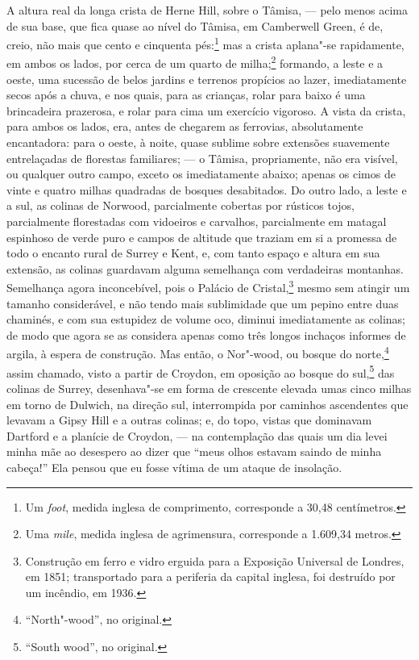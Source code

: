 A altura real da longa crista de Herne Hill, sobre o Tâmisa, --- pelo
menos acima de sua base, que fica quase ao nível do Tâmisa, em
Camberwell Green, é de, creio, não mais que cento e cinquenta
pés:\footnote{Um \textit{foot}, medida inglesa de comprimento, corresponde
  a 30,48 centímetros.} mas a crista aplana"-se rapidamente, em
ambos os lados, por cerca de um quarto de milha;\footnote{Uma
  \textit{mile}, medida inglesa de agrimensura, corresponde a 1.609,34 metros.} formando, a leste e a oeste, uma sucessão de belos
jardins e terrenos propícios ao lazer, imediatamente secos após a chuva,
e nos quais, para as crianças, rolar para baixo é uma brincadeira
prazerosa, e rolar para cima um exercício vigoroso. A vista da crista,
para ambos os lados, era, antes de chegarem as ferrovias, absolutamente
encantadora: para o oeste, à noite, quase sublime sobre extensões
suavemente entrelaçadas de florestas familiares; --- o Tâmisa,
propriamente, não era visível, ou qualquer outro campo, exceto os
imediatamente abaixo; apenas os cimos de vinte e quatro milhas quadradas
de bosques desabitados. Do outro lado, a leste e a sul, as colinas de
Norwood, parcialmente cobertas por rústicos tojos, parcialmente
florestadas com vidoeiros e carvalhos, parcialmente em matagal espinhoso
de verde puro e campos de altitude que traziam em si a promessa de todo
o encanto rural de Surrey e Kent, e, com tanto espaço e altura em sua
extensão, as colinas guardavam alguma semelhança com verdadeiras
montanhas. Semelhança agora inconcebível, pois o Palácio de
Cristal,\footnote{Construção em ferro e vidro erguida para a Exposição
  Universal de Londres, em 1851; transportado para a periferia da
  capital inglesa, foi destruído por um incêndio, em 1936.} mesmo sem atingir um tamanho considerável, e não tendo mais
sublimidade que um pepino entre duas chaminés, e com sua estupidez de
volume oco, diminui imediatamente as colinas; de modo que agora se as
considera apenas como três longos inchaços informes de argila, à espera
de construção. Mas então, o Nor"-wood, ou bosque do norte,\footnote{``North"-wood'',
  no original.} assim chamado, visto a partir de
Croydon, em oposição ao bosque do sul,\footnote{``South wood'', no
  original.} das colinas de Surrey, desenhava"-se em
forma de crescente elevada umas cinco milhas em torno de Dulwich, na
direção sul, interrompida por caminhos ascendentes que levavam a Gipsy
Hill e a outras colinas; e, do topo, vistas que dominavam Dartford e a
planície de Croydon, --- na contemplação das quais um dia levei minha mãe
ao desespero ao dizer que ``meus olhos estavam saindo de minha cabeça!''
Ela pensou que eu fosse vítima de um ataque de insolação.

